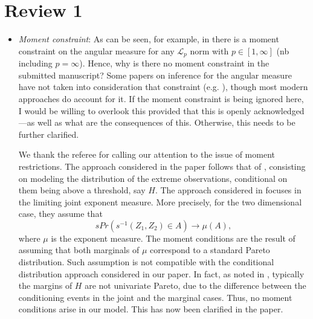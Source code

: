 \documentclass[10pt]{article}
\newcommand{\comment}[1]{\textcolor{teal}{#1}}
\begin{document}
\section*{Review 1}
\begin{itemize}
\item \emph{Moment constraint}: As can be seen, for example, in \cite[Equation 4.1]{einmahl2009}
    there is a moment constraint on the angular measure for any $\mathcal{L}_p$ norm with 
    $p \in [1, \infty]$ (nb including $p = \infty$).  Hence, why is there no moment constraint in 
    the submitted 
    manuscript? Some papers on inference for the angular measure have not taken into consideration 
    that constraint (e.g. \cite{einmahl2001}), though most modern approaches do account for it. If 
    the moment constraint is being ignored here, I would be willing to overlook this provided that 
    this is openly acknowledged---as well as what are the consequences of this. Otherwise, this needs 
    to be further clarified.

    
We thank the referee for calling our attention to
    the issue of moment restrictions. The approach considered in the
    paper follows that of \cite{rootzen2018}, consisting on modeling the
    distribution of the extreme observations, conditional on them being
    above a threshold, say $H$.  The approach considered in
    \cite{EiSe2009} focuses in the limiting joint exponent measure. More
    precisely, for the two dimensional case, they assume that
    \[
        sPr(s^{-1}(Z_1,Z_2) \in A) \rightarrow \mu(A),
    \]
    where $\mu$ is the exponent measure. The moment conditions are
    the result of assuming that both marginals of $\mu$ correspond to a
    standard Pareto distribution. Such assumption is not compatible
    with the conditional distribution approach considered in our paper.
    In fact, as noted in \cite{KiRoSeWa2019}, typically the margins of
    $H$ are not univariate Pareto, due to the difference between the 
    conditioning events in the joint and the marginal cases. Thus, no
    moment conditions arise in our model. This has now been clarified in the paper.


\end{itemize}
\end{document}
